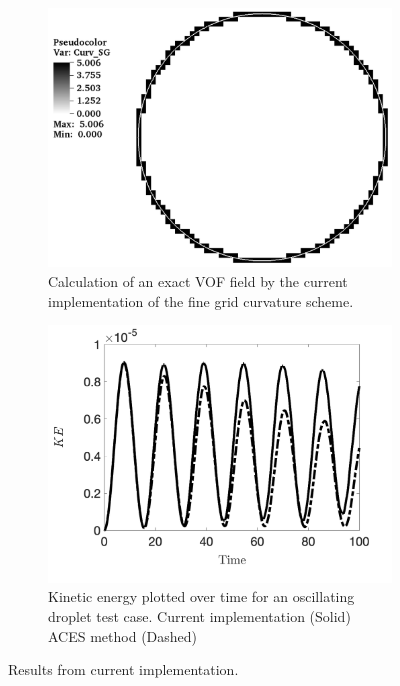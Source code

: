\begin{figure}[htbp]
	\centering
	\begin{subfigure}{.45\textwidth}
		\centering
		\includegraphics[width=1.0\linewidth]{figs/curvCalc.png}
		\caption{Calculation of an exact VOF field by the current implementation of the fine grid curvature scheme.}
		\label{fig:fgVelCurv}
	\end{subfigure}%
	\hfill
	\begin{subfigure}{0.45\textwidth}
		\centering
		\includegraphics[width=1.0\linewidth]{figs/current_KEplot.png}
		\caption{Kinetic energy plotted over time for an oscillating droplet test case. Current implementation (Solid) ACES method (Dashed)}
		\label{fig:fgVelKE}
	\end{subfigure}
\caption{Results from current implementation.}
\end{figure}

